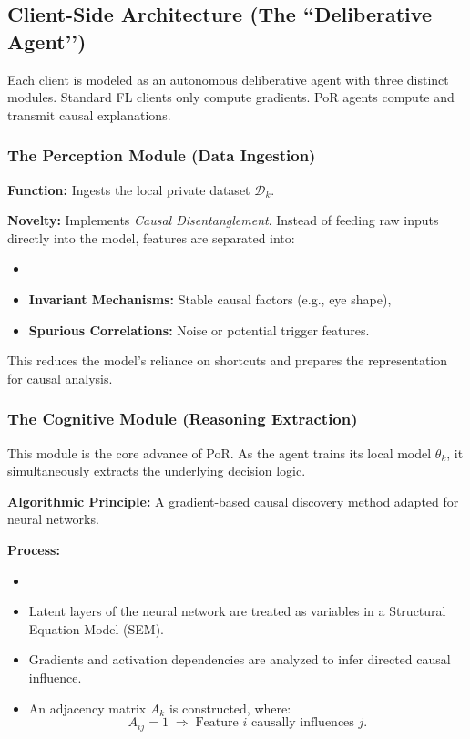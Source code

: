 \documentclass[journal]{IEEEtran}
\begin{document}
\subsection{Client-Side Architecture (The ``Deliberative Agent’’)}

Each client is modeled as an autonomous deliberative agent with three distinct modules. Standard FL clients only compute gradients. PoR agents compute and transmit causal explanations.

\subsubsection{The Perception Module (Data Ingestion)}

\textbf{Function:}
Ingests the local private dataset $\mathcal{D}_k$.

\textbf{Novelty:}
Implements \emph{Causal Disentanglement}. Instead of feeding raw inputs directly into the model, features are separated into:
\begin{itemize}
\item  \item \textbf{Invariant Mechanisms:} Stable causal factors (e.g., eye shape),
 \item \textbf{Spurious Correlations:} Noise or potential trigger features. \end{itemize}

This reduces the model’s reliance on shortcuts and prepares the representation for causal analysis.

\subsubsection{The Cognitive Module (Reasoning Extraction)}

This module is the core advance of PoR. As the agent trains its local model $\theta_k$, it simultaneously extracts the underlying decision logic.

\textbf{Algorithmic Principle:}
A gradient-based causal discovery method adapted for neural networks.

\textbf{Process:}
\begin{itemize}
\item  \item Latent layers of the neural network are treated as variables in a Structural Equation Model (SEM). \item Gradients and activation dependencies are analyzed to infer directed causal influence. \item An adjacency matrix $A_k$ is constructed, where:
 \[
 A_{ij} = 1 \;\Longrightarrow\; \text{Feature } i \text{ causally influences } j. \]
\end{itemize}
\end{document}
